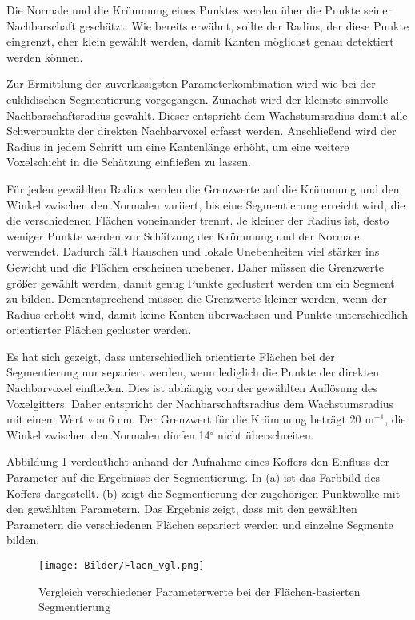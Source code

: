 Die Normale und die Krümmung eines Punktes werden über die Punkte seiner Nachbarschaft geschätzt. Wie bereits erwähnt, sollte der Radius, der diese Punkte eingrenzt, eher klein gewählt werden, damit Kanten möglichst genau detektiert werden können. 

Zur Ermittlung der zuverlässigsten Parameterkombination wird wie bei der eu\-kli\-disch\-en Segmentierung vorgegangen. Zunächst wird der kleinste sinnvolle Nach\-bar\-schafts\-ra\-di\-us gewählt. Dieser entspricht dem Wachstumsradius damit alle Schwerpunkte der direkten Nachbarvoxel erfasst werden. Anschließend wird der Radius in jedem Schritt um eine Kantenlänge erhöht, um eine weitere Voxelschicht in die Schätzung einfließen zu lassen. 

Für jeden gewählten Radius werden die Grenzwerte auf die Krümmung und den Winkel zwischen den Normalen variiert, bis eine Segmentierung erreicht wird, die die verschiedenen Flächen voneinander trennt. Je kleiner der Radius ist, desto weniger Punkte werden zur Schätzung der Krümmung und der Normale verwendet. Dadurch fällt Rauschen und lokale Unebenheiten viel stärker ins Gewicht und die Flächen erscheinen unebener. Daher müssen die Grenzwerte größer gewählt werden, damit genug Punkte geclustert werden um ein Segment zu bilden. Dementsprechend müssen die Grenzwerte kleiner werden, wenn der Radius erhöht wird, damit keine Kanten überwachsen und Punkte unterschiedlich orientierter Flächen gecluster werden. 

Es hat sich gezeigt, dass unterschiedlich orientierte Flächen bei der Segmentierung nur separiert werden, wenn lediglich die Punkte der direkten Nachbarvoxel einfließen. Dies ist abhängig von der gewählten Auflösung des Voxelgitters. Daher entspricht der Nachbarschaftsradius dem Wachstumsradius mit einem Wert von 6 cm. Der Grenzwert für die Krümmung beträgt 20 $ \text{m}^{-1} $, die Winkel zwischen den Normalen dürfen 14$ ^\circ $ nicht überschreiten.

Abbildung \ref{fig:vgl_smoothness} verdeutlicht anhand der Aufnahme eines Koffers den Einfluss der Parameter auf die Ergebnisse der Segmentierung. In (a) ist das Farbbild des Koffers dargestellt. (b) zeigt die Segmentierung der zugehörigen Punktwolke mit den gewählten Parametern. Das Ergebnis zeigt, dass mit den gewählten Parametern die verschiedenen Flächen separiert werden und einzelne Segmente bilden. 

\begin{figure}[htb]
	\centering
	\texttt{[image: Bilder/Flaen\_vgl.png]}
	\caption{Vergleich verschiedener Parameterwerte bei der Flächen-basierten Segmentierung}
	\label{fig:vgl_smoothness}
\end{figure}

